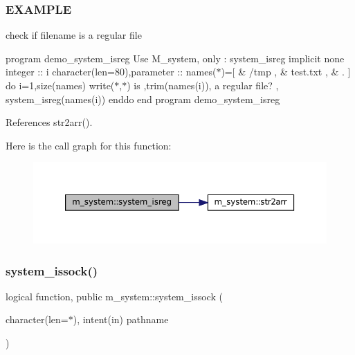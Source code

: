 \subsubsection*{E\+X\+A\+M\+P\+LE}

check if filename is a regular file

program demo\+\_\+system\+\_\+isreg Use M\+\_\+system, only \+: system\+\_\+isreg implicit none integer \+:\+: i character(len=80),parameter \+:\+: names($\ast$)=\mbox{[} \& \textquotesingle{}/tmp \textquotesingle{}, \& \textquotesingle{}test.\+txt \textquotesingle{}, \& \textquotesingle{}. \textquotesingle{}\mbox{]} do i=1,size(names) write($\ast$,$\ast$)\textquotesingle{} is \textquotesingle{},trim(names(i)),\textquotesingle{} a regular file? \textquotesingle{}, system\+\_\+isreg(names(i)) enddo end program demo\+\_\+system\+\_\+isreg 

References str2arr().

Here is the call graph for this function\+:
\nopagebreak
\begin{figure}[H]
\begin{center}
\leavevmode
\includegraphics[width=350pt]{namespacem__system_a127bdd84ccd4b52f3f29abbc56af029b_cgraph}
\end{center}
\end{figure}
\mbox{\label{namespacem__system_af6eb5074fe74552bc7a5e7d00f459087}} 
\subsubsection{\texorpdfstring{system\+\_\+issock()}{system\_issock()}}
{\footnotesize\ttfamily logical function, public m\+\_\+system\+::system\+\_\+issock (\begin{DoxyParamCaption}\item[{character(len=$\ast$), intent(in)}]{pathname }\end{DoxyParamCaption})}




